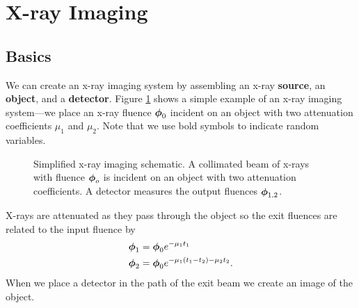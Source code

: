 \documentclass[mphy386-notes.tex]{subfiles}
\begin{document}
\section{X-ray Imaging}
\subsection{Basics}
We can create an x-ray imaging system by assembling an x-ray \textbf{source}, an
\textbf{object}, and a \textbf{detector}. Figure \ref{fig:simple} shows a simple
example of an x-ray imaging system---we place an x-ray fluence $\boldsymbol{\phi}_0$
incident on an object with two attenuation coefficients $\mu_1$ and $\mu_2$. Note that we use bold symbols to indicate random variables.
\begin{figure}[h]
\begin{center}
\end{center}
\captionsetup{width=1.0\linewidth}
\caption{Simplified x-ray imaging schematic. A collimated beam of x-rays with
  fluence $\boldsymbol{\phi}_o$ is incident on an object with two attenuation
  coefficients. A detector measures the output fluences $\boldsymbol{\phi}_{1,2}$.}
\label{fig:simple}
\end{figure}
X-rays are attenuated as they pass through the object so the exit fluences are
related to the input fluence by
\begin{align}
  \boldsymbol{\phi}_1 &= \boldsymbol{\phi}_0e^{-\mu_1 t_1}\\
  \boldsymbol{\phi}_2 &= \boldsymbol{\phi}_0e^{-\mu_1(t_1 - t_2) - \mu_2t_2}. 
\end{align}
When we place a detector in the path of the exit beam we create an image of the
object. 
\end{document}
